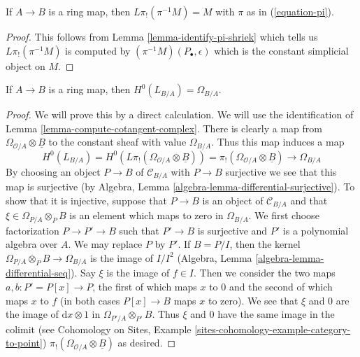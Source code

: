 \begin{lemma}
\label{lemma-pi-lower-shriek-constant-sheaf}
If $A \to B$ is a ring map, then $L\pi_!(\pi^{-1}M) = M$
with $\pi$ as in (\ref{equation-pi}).
\end{lemma}

\begin{proof}
This follows from Lemma \ref{lemma-identify-pi-shriek} which tells us
$L\pi_!(\pi^{-1}M)$ is computed by $(\pi^{-1}M)(P_\bullet, \epsilon)$
which is the constant simplicial object on $M$.
\end{proof}

\begin{lemma}
\label{lemma-identify-H0}
If $A \to B$ is a ring map, then $H^0(L_{B/A}) = \Omega_{B/A}$.
\end{lemma}

\begin{proof}
We will prove this by a direct calculation.
We will use the identification of Lemma \ref{lemma-compute-cotangent-complex}.
There is clearly a map from $\Omega_{\mathcal{O}/A} \otimes \underline{B}$
to the constant sheaf with value $\Omega_{B/A}$. Thus this map induces
a map
$$
H^0(L_{B/A}) = H^0(L\pi_!(\Omega_{\mathcal{O}/A} \otimes \underline{B}))
= \pi_!(\Omega_{\mathcal{O}/A} \otimes \underline{B}) \to \Omega_{B/A}
$$
By choosing an object $P \to B$ of $\mathcal{C}_{B/A}$ with $P \to B$
surjective we see that this map is surjective (by
Algebra, Lemma \ref{algebra-lemma-differential-surjective}).
To show that it is injective, suppose that $P \to B$ is an object
of $\mathcal{C}_{B/A}$ and that $\xi \in \Omega_{P/A} \otimes_P B$
is an element which maps to zero in $\Omega_{B/A}$.
We first choose factorization $P \to P' \to B$ such that $P' \to B$
is surjective and $P'$ is a polynomial algebra over $A$.
We may replace $P$ by $P'$. If $B = P/I$, then the kernel
$\Omega_{P/A} \otimes_P B \to \Omega_{B/A}$ is the image of
$I/I^2$ (Algebra, Lemma \ref{algebra-lemma-differential-seq}).
Say $\xi$ is the image of $f \in I$.
Then we consider the two maps $a, b : P' = P[x] \to P$, the first of which
maps $x$ to $0$ and the second of which maps $x$ to $f$ (in both
cases $P[x] \to B$ maps $x$ to zero). We see that $\xi$ and $0$
are the image of $\text{d}x \otimes 1$ in $\Omega_{P'/A} \otimes_{P'} B$.
Thus $\xi$ and $0$ have the same image in the colimit (see
Cohomology on Sites, Example \ref{sites-cohomology-example-category-to-point})
$\pi_!(\Omega_{\mathcal{O}/A} \otimes \underline{B})$ as desired.
\end{proof}

